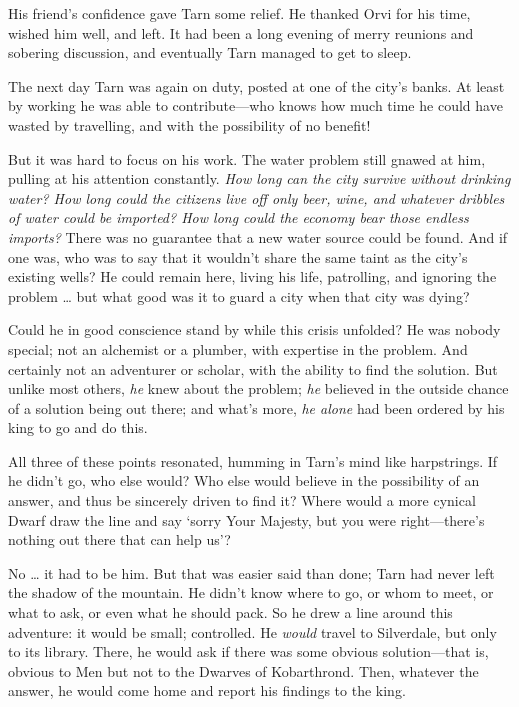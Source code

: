 His friend's confidence gave Tarn some relief.  He thanked Orvi for his time, wished him well, and left.  It had been a long evening of merry reunions and sobering discussion, and eventually Tarn managed to get to sleep.

The next day Tarn was again on duty, posted at one of the city's banks.  At least by working he was able to contribute---who knows how much time he could have wasted by travelling, and with the possibility of no benefit!

But it was hard to focus on his work.  The water problem still gnawed at him, pulling at his attention constantly.  \emph{How long can the city survive without drinking water?  How long could the citizens live off only beer, wine, and whatever dribbles of water could be imported?  How long could the economy bear those endless imports?}  There was no guarantee that a new water source could be found.  And if one was, who was to say that it wouldn't share the same taint as the city's existing wells?  He could remain here, living his life, patrolling, and ignoring the problem \ldots{} but what good was it to guard a city when that city was dying?

Could he in good conscience stand by while this crisis unfolded?  He was nobody special; not an alchemist or a plumber, with expertise in the problem.  And certainly not an adventurer or scholar, with the ability to find the solution. But unlike most others, \emph{he} knew about the problem; \emph{he} believed in the outside chance of a solution being out there; and what's more, \emph{he alone} had been ordered by his king to go and do this.

All three of these points resonated, humming in Tarn's mind like harpstrings.  If he didn't go, who else would?  Who else would believe in the possibility of an answer, and thus be sincerely driven to find it?  Where would a more cynical Dwarf draw the line and say `sorry Your Majesty, but you were right---there's nothing out there that can help us'?

No \ldots{} it had to be him.  But that was easier said than done; Tarn had never left the shadow of the mountain.  He didn't know where to go, or whom to meet, or what to ask, or even what he should pack.  So he drew a line around this adventure: it would be small; controlled.  He \emph{would} travel to Silverdale, but only to its library.  There, he would ask if there was some obvious solution---that is, obvious to Men but not to the Dwarves of Kobarthrond.  Then, whatever the answer, he would come home and report his findings to the king.


